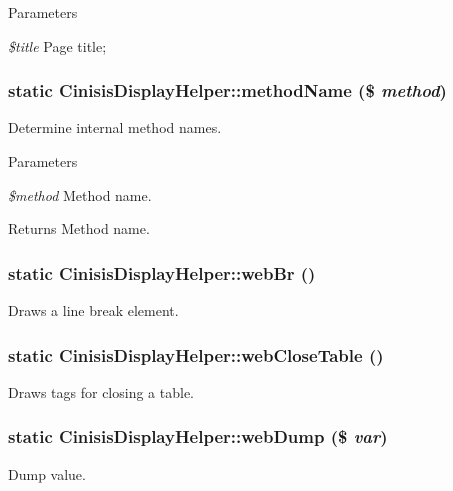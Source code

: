 \begin{DoxyParams}{Parameters}
\item[{\em \$title}]Page title; \end{DoxyParams}
\hypertarget{classCinisisDisplayHelper_ab263cf81e5c459c60baa6ef7fa5f76b2}{
\subsubsection[{methodName}]{\setlength{\rightskip}{0pt plus 5cm}static CinisisDisplayHelper::methodName (\$ {\em method})}}
\label{classCinisisDisplayHelper_ab263cf81e5c459c60baa6ef7fa5f76b2}
Determine internal method names.


\begin{DoxyParams}{Parameters}
\item[{\em \$method}]Method name.\end{DoxyParams}
\begin{DoxyReturn}{Returns}
Method name. 
\end{DoxyReturn}
\hypertarget{classCinisisDisplayHelper_a9c8b637e47e4263901baf4c5f2064d8d}{
\subsubsection[{webBr}]{\setlength{\rightskip}{0pt plus 5cm}static CinisisDisplayHelper::webBr ()}}
\label{classCinisisDisplayHelper_a9c8b637e47e4263901baf4c5f2064d8d}
Draws a line break element. \hypertarget{classCinisisDisplayHelper_ab4e55ec58b59bc8b2af32b93cdf0d7c1}{
\subsubsection[{webCloseTable}]{\setlength{\rightskip}{0pt plus 5cm}static CinisisDisplayHelper::webCloseTable ()}}
\label{classCinisisDisplayHelper_ab4e55ec58b59bc8b2af32b93cdf0d7c1}
Draws tags for closing a table. \hypertarget{classCinisisDisplayHelper_a7811830062abc85b90cf391a9ff89fdf}{
\subsubsection[{webDump}]{\setlength{\rightskip}{0pt plus 5cm}static CinisisDisplayHelper::webDump (\$ {\em var})}}
\label{classCinisisDisplayHelper_a7811830062abc85b90cf391a9ff89fdf}
Dump value.


